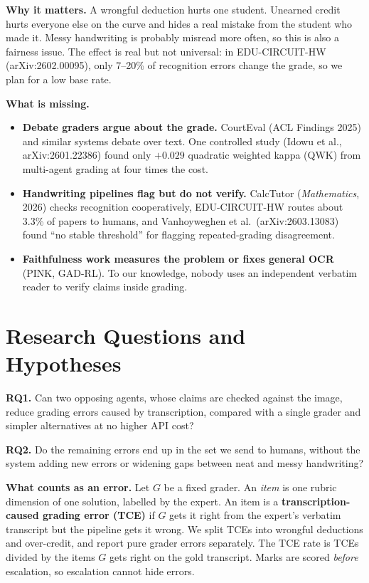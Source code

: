\documentclass[11pt,a4paper]{article}
\begin{document}
\textbf{Why it matters.} A wrongful deduction hurts one student. Unearned credit hurts everyone else on the curve and hides a real mistake from the student who made it. Messy handwriting is probably misread more often, so this is also a fairness issue. The effect is real but not universal: in EDU-CIRCUIT-HW (arXiv:2602.00095), only 7--20\% of recognition errors change the grade, so we plan for a low base rate.

\textbf{What is missing.}
\begin{itemize}
\item \textbf{Debate graders argue about the grade.} CourtEval (ACL Findings 2025) and similar systems debate over text. One controlled study (Idowu et al., arXiv:2601.22386) found only $+0.029$ quadratic weighted kappa (QWK) from multi-agent grading at four times the cost.
\item \textbf{Handwriting pipelines flag but do not verify.} CalcTutor (\emph{Mathematics}, 2026) checks recognition cooperatively, EDU-CIRCUIT-HW routes about 3.3\% of papers to humans, and Vanhoyweghen et al.\ (arXiv:2603.13083) found ``no stable threshold'' for flagging repeated-grading disagreement.
\item \textbf{Faithfulness work measures the problem or fixes general OCR} (PINK, GAD-RL). To our knowledge, nobody uses an independent verbatim reader to verify claims inside grading.
\end{itemize}

\section{Research Questions and Hypotheses}

\textbf{RQ1.} Can two opposing agents, whose claims are checked against the image, reduce grading errors caused by transcription, compared with a single grader and simpler alternatives at no higher API cost?

\textbf{RQ2.} Do the remaining errors end up in the set we send to humans, without the system adding new errors or widening gaps between neat and messy handwriting?

\textbf{What counts as an error.} Let $G$ be a fixed grader. An \emph{item} is one rubric dimension of one solution, labelled by the expert. An item is a \textbf{transcription-caused grading error (TCE)} if $G$ gets it right from the expert's verbatim transcript but the pipeline gets it wrong. We split TCEs into wrongful deductions and over-credit, and report pure grader errors separately. The TCE rate is TCEs divided by the items $G$ gets right on the gold transcript. Marks are scored \emph{before} escalation, so escalation cannot hide errors.
\end{document}
